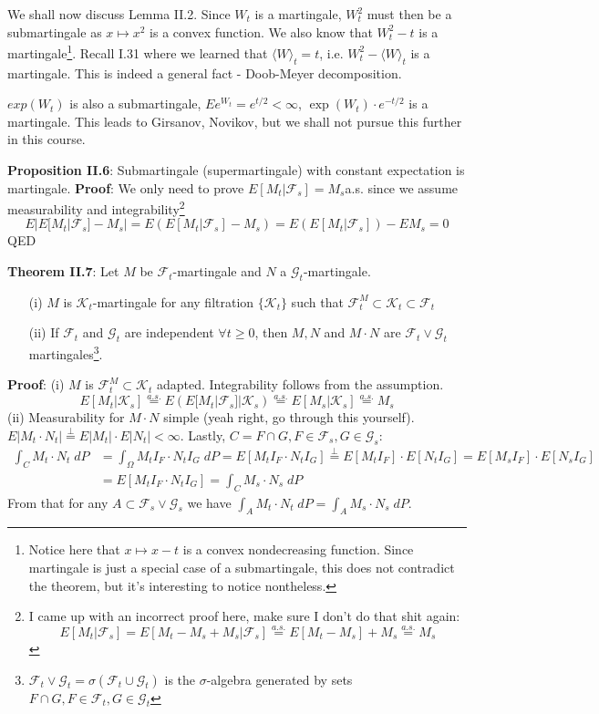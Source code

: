 \documentclass[english]{article}
\newcommand{\note}[1]{\noindent\textbf{#1}}
\newcommand{\F}{\mathcal F}
\newcommand{\as}[1]{\stackrel {a.s.}{#1}}
\begin{document}
We shall now discuss Lemma II.2. Since $W_t$ is a martingale, $W_t^2$ must then be a submartingale as $x\mapsto x^2$ is a convex function. We also know that $W^2_t - t$ is a martingale\footnote{Notice here that $x\mapsto x-t$ is a convex nondecreasing function. Since martingale is just a special case of a submartingale, this does not contradict the theorem, but it's interesting to notice nontheless.}. Recall I.31 where we learned that $\langle W \rangle_t = t$, i.e. $W^2_t - \langle W \rangle_t$ is a martingale. This is indeed a general fact - Doob-Meyer decomposition.

$exp(W_t)$ is also a submartingale, $Ee^{W_t} = e^{t/2} < \infty$, $\exp(W_t) \cdot e^{-t/2}$ is a martingale. This leads to Girsanov, Novikov, but we shall not pursue this further in this course. \newline

\note{Proposition II.6}: Submartingale (supermartingale) with constant expectation is martingale.\newline
\note{Proof}: We only need to prove $E[M_t | \F_s] = M_s $a.s. since we assume measurability and integrability\footnote{I came up with an incorrect proof here, make sure I don't do that shit again:
$$E[M_t | \F_s] = E[M_t - M_s + M_s | \F_s] \as= E[M_t - M_s] + M_s \as= M_s$$}
$$E|E[M_t|\F_s] - M_s | = E(E[M_t|\F_s] - M_s) = E(E[M_t |\F_s]) - EM_s = 0$$
QED\newline

\note{Theorem II.7}: Let $M$ be $\F_t$-martingale and $N$ a $\mathcal G_t$-martingale.\begin{itemize}
\item[(i)] $M$ is $\mathcal K_t$-martingale for any filtration $\{\mathcal K_t\}$ such that $\mathcal F^M_t \subset \mathcal K_t \subset \F_t$
\item[(ii)] If $\F_t$ and $\mathcal G_t$ are independent $\forall t\geq 0$, then $M, N$ and $M\cdot N$ are $\F_t \vee \mathcal G_t$ martingales\footnote{$\F_t \vee \mathcal G_t = \sigma(\F_t \cup \mathcal G_t)$ is the $\sigma$-algebra generated by sets $F\cap G, F\in \F_t, G\in\mathcal G_t$}.
\end{itemize}
\note{Proof}: (i) $M$ is $\F^M_t \subset \mathcal K_t$ adapted. Integrability follows from the assumption.
$$E[M_t | \mathcal K_s] \as= E(E[M_t| \F_s]|\mathcal K_s) \as= E[M_s|\mathcal K_s] \as= M_s$$
(ii) Measurability for $M\cdot N$ simple (yeah right, go through this yourself). $E|M_t \cdot N_t| \stackrel \bot= E|M_t| \cdot E|N_t| < \infty$.\newline
Lastly, $C= F\cap G, F\in \F_s, G\in \mathcal G_s$:
\begin{align*}\int_C M_t \cdot N_t\;dP & = \int_\Omega M_t I_F \cdot N_t I_G \;dP = E[M_t I_F \cdot N_t I_G] \stackrel \bot= E[M_t I_F] \cdot E[N_t I_G] = E[M_s I_F] \cdot E[N_s I_G] \\
&= E[M_t I_F \cdot N_t I_G] = \int_{C} M_s \cdot N_s \; dP\end{align*}
From that for any $A \subset \F_s \vee \mathcal G_s$ we have $\int_A M_t \cdot N_t \; dP = \int_A M_s \cdot N_s \; dP$.
\end{document}
